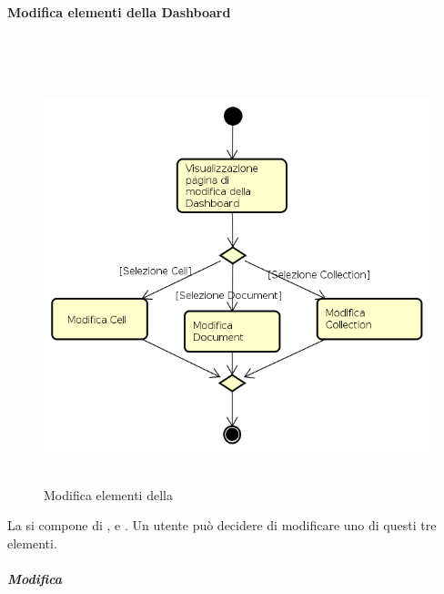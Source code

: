 \paragraph{Modifica elementi della Dashboard} \mbox{} \\
\begin{figure}[H]
\begin{center}
\includegraphics[height=12cm]{res/sections/backend/activities/modificaElementDashboard.png}
\caption{Modifica elementi della }
\end{center}
\end{figure}
\newpage
La  si compone di ,  e . Un utente può decidere di modificare uno di questi tre elementi.
\subparagraph{Modifica } \mbox{} \\
